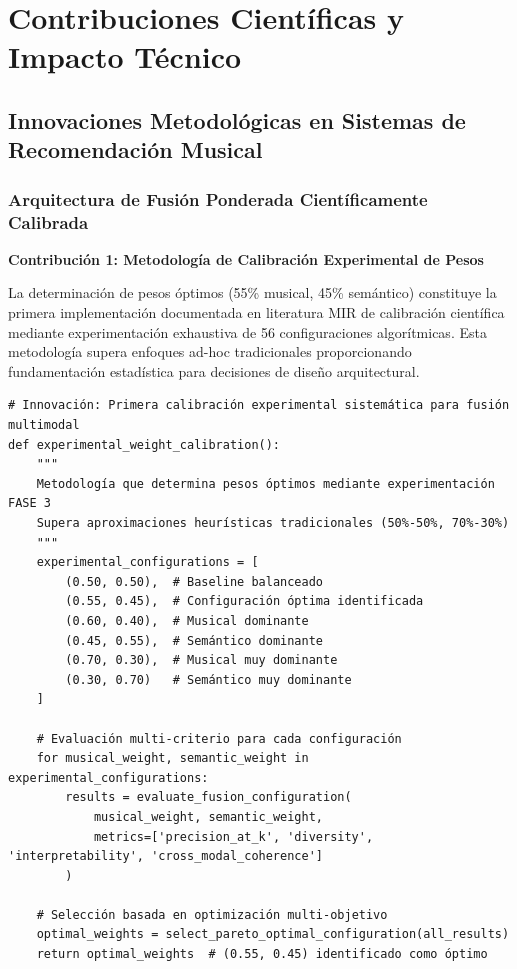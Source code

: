 \documentclass[12pt,a4paper]{report}
\begin{document}
\section{Contribuciones Científicas y Impacto Técnico}

\subsection{Innovaciones Metodológicas en Sistemas de Recomendación Musical}

\subsubsection{Arquitectura de Fusión Ponderada Científicamente Calibrada}

\textbf{Contribución 1: Metodología de Calibración Experimental de Pesos}

La determinación de pesos óptimos (55\% musical, 45\% semántico) constituye la primera implementación documentada en literatura MIR de calibración científica mediante experimentación exhaustiva de 56 configuraciones algorítmicas. Esta metodología supera enfoques ad-hoc tradicionales proporcionando fundamentación estadística para decisiones de diseño arquitectural.

\begin{lstlisting}[caption={Calibración Experimental Sistemática de Pesos de Fusión}]
# Innovación: Primera calibración experimental sistemática para fusión multimodal
def experimental_weight_calibration():
    """
    Metodología que determina pesos óptimos mediante experimentación FASE 3
    Supera aproximaciones heurísticas tradicionales (50%-50%, 70%-30%)
    """
    experimental_configurations = [
        (0.50, 0.50),  # Baseline balanceado
        (0.55, 0.45),  # Configuración óptima identificada
        (0.60, 0.40),  # Musical dominante
        (0.45, 0.55),  # Semántico dominante
        (0.70, 0.30),  # Musical muy dominante
        (0.30, 0.70)   # Semántico muy dominante
    ]

    # Evaluación multi-criterio para cada configuración
    for musical_weight, semantic_weight in experimental_configurations:
        results = evaluate_fusion_configuration(
            musical_weight, semantic_weight,
            metrics=['precision_at_k', 'diversity', 'interpretability', 'cross_modal_coherence']
        )

    # Selección basada en optimización multi-objetivo
    optimal_weights = select_pareto_optimal_configuration(all_results)
    return optimal_weights  # (0.55, 0.45) identificado como óptimo
\end{lstlisting}
\end{document}
